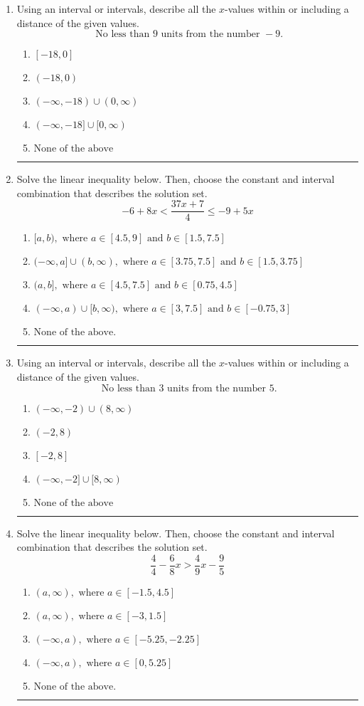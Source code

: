 \documentclass[14pt]{extbook}
\newcommand{\litem}[1]{\item#1\hspace*{-1cm}\rule{\textwidth}{0.4pt}}
\begin{document}
\begin{enumerate}
{\begin{enumerate}[label=\Alph*.]
\end{enumerate} }
\litem{
Using an interval or intervals, describe all the $x$-values within or including a distance of the given values.\[ \text{ No less than } 9 \text{ units from the number } -9. \]\begin{enumerate}[label=\Alph*.]
\item \( [-18, 0] \)
\item \( (-18, 0) \)
\item \( (-\infty, -18) \cup (0, \infty) \)
\item \( (-\infty, -18] \cup [0, \infty) \)
\item \( \text{None of the above} \)

\end{enumerate} }
\litem{
Solve the linear inequality below. Then, choose the constant and interval combination that describes the solution set.\[ -6 + 8 x < \frac{37 x + 7}{4} \leq -9 + 5 x \]\begin{enumerate}[label=\Alph*.]
\item \( [a, b), \text{ where } a \in [4.5, 9] \text{ and } b \in [1.5, 7.5] \)
\item \( (-\infty, a] \cup (b, \infty), \text{ where } a \in [3.75, 7.5] \text{ and } b \in [1.5, 3.75] \)
\item \( (a, b], \text{ where } a \in [4.5, 7.5] \text{ and } b \in [0.75, 4.5] \)
\item \( (-\infty, a) \cup [b, \infty), \text{ where } a \in [3, 7.5] \text{ and } b \in [-0.75, 3] \)
\item \( \text{None of the above.} \)

\end{enumerate} }
\litem{
Using an interval or intervals, describe all the $x$-values within or including a distance of the given values.\[ \text{ No less than } 3 \text{ units from the number } 5. \]\begin{enumerate}[label=\Alph*.]
\item \( (-\infty, -2) \cup (8, \infty) \)
\item \( (-2, 8) \)
\item \( [-2, 8] \)
\item \( (-\infty, -2] \cup [8, \infty) \)
\item \( \text{None of the above} \)

\end{enumerate} }
\litem{
Solve the linear inequality below. Then, choose the constant and interval combination that describes the solution set.\[ \frac{4}{4} - \frac{6}{8} x > \frac{4}{9} x - \frac{9}{5} \]\begin{enumerate}[label=\Alph*.]
\item \( (a, \infty), \text{ where } a \in [-1.5, 4.5] \)
\item \( (a, \infty), \text{ where } a \in [-3, 1.5] \)
\item \( (-\infty, a), \text{ where } a \in [-5.25, -2.25] \)
\item \( (-\infty, a), \text{ where } a \in [0, 5.25] \)
\item \( \text{None of the above}. \)


\end{enumerate}}
\end{enumerate}
\end{document}
